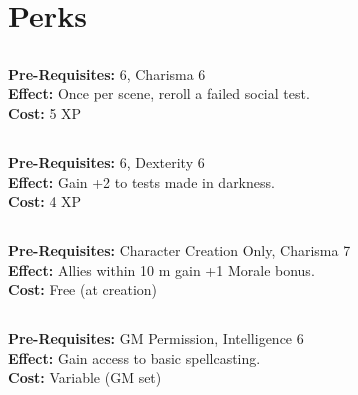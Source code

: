 \documentclass[12pt]{article}
\begin{document}
\section{Perks}
\begin{multicols}{2}





\subsection*{}
\textbf{Pre-Requisites:}  6, Charisma 6\\
\textbf{Effect:} Once per scene, reroll a failed social test.\\
\textbf{Cost:} 5 XP

\medskip

\subsection*{}
\textbf{Pre-Requisites:}  6, Dexterity 6\\
\textbf{Effect:} Gain +2 to  tests made in darkness.\\
\textbf{Cost:} 4 XP

\medskip

\subsection*{}
\textbf{Pre-Requisites:} Character Creation Only, Charisma 7\\
\textbf{Effect:} Allies within 10 m gain +1 Morale bonus.\\
\textbf{Cost:} Free (at creation)

\medskip

\subsection*{}
\textbf{Pre-Requisites:} GM Permission, Intelligence 6\\
\textbf{Effect:} Gain access to basic spellcasting.\\
\textbf{Cost:} Variable (GM set)


\end{multicols}
\end{document}
